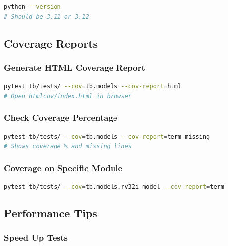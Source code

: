 \begin{lstlisting}[language=bash]
python --version
# Should be 3.11 or 3.12
\end{lstlisting}

\subsection{Coverage Reports}\label{um:guide:local-qa:coverage-reports}

\subsubsection{Generate HTML Coverage Report}\label{um:guide:local-qa:generate-html-coverage-report}

\begin{lstlisting}[language=bash]
pytest tb/tests/ --cov=tb.models --cov-report=html
# Open htmlcov/index.html in browser
\end{lstlisting}

\subsubsection{Check Coverage Percentage}\label{um:guide:local-qa:check-coverage-percentage}

\begin{lstlisting}[language=bash]
pytest tb/tests/ --cov=tb.models --cov-report=term-missing
# Shows coverage % and missing lines
\end{lstlisting}

\subsubsection{Coverage on Specific Module}\label{um:guide:local-qa:coverage-on-specific-module}

\begin{lstlisting}[language=bash]
pytest tb/tests/ --cov=tb.models.rv32i_model --cov-report=term
\end{lstlisting}

\subsection{Performance Tips}\label{um:guide:local-qa:performance-tips}

\subsubsection{Speed Up Tests}\label{um:guide:local-qa:speed-up-tests}

